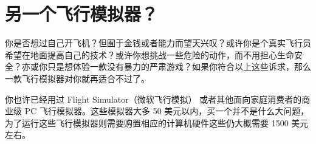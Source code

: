 \section{另一个飞行模拟器？}
\fi
\ifchinese
{}
\fi

\ifchinese
你是否想过自己开飞机？但囿于金钱或者能力而望天兴叹？或许你是个真实飞行员希望在地面提高自己的技术？或许你想挑战一些危险的动作，而不用担心生命安全？亦或你只是想体验一款没有暴力的严肃游戏？如果你符合以上这些诉求，那么一款飞行模拟器对你就再适合不过了。

你也许已经用过  Flight Simulator（微软飞行模拟） 或者其他面向家庭消费者的商业级 PC 飞行模拟器。这些模拟器大多 50 美元以内，买一个并不是什么大问题，为了运行这些飞行模拟器则需要购置相应的计算机硬件这些仍大概需要 1500 美元左右。

